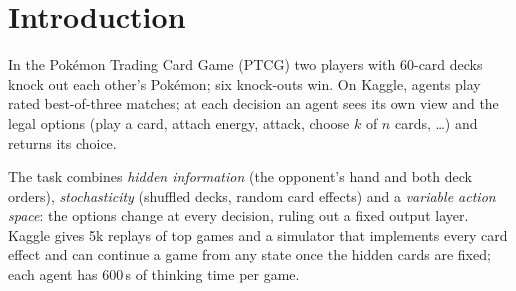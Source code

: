 \documentclass{article}
\begin{document}

\printAffiliationsAndNotice{}

\begin{abstract}
This work studies agents for the Kaggle \emph{PTCG AI Battle Challenge} (Pok\'emon Trading Card Game). A first agent, \emph{DualCross}, imitates top-rated players with a transformer refined by reinforcement learning; it matches 63\% of expert decisions but rates only 648 on the Kaggle leaderboard. A second agent, \emph{PTCGNet}, uses a smaller network to guide a Monte Carlo tree search on the game simulator. Search raises the fraction of games won against six fixed opponents from 0.75 to 0.90, and the best submission rates 773.2, 154th of 432 participants. Predicting the opponent's hand beats card counting but does not help the search.
\end{abstract}

\section{Introduction}
In the Pok\'emon Trading Card Game (PTCG) two players with 60-card decks knock out each other's Pok\'emon; six knock-outs win. On Kaggle, agents play rated best-of-three matches; at each decision an agent sees its own view and the legal options (play a card, attach energy, attack, choose $k$ of $n$ cards, \dots) and returns its choice.

The task combines \emph{hidden information} (the opponent's hand and both deck orders), \emph{stochasticity} (shuffled decks, random card effects) and a \emph{variable action space}: the options change at every decision, ruling out a fixed output layer. Kaggle gives 5k replays of top games and a simulator that implements every card effect and can continue a game from any state once the hidden cards are fixed; each agent has 600\,s of thinking time per game.
\end{document}
